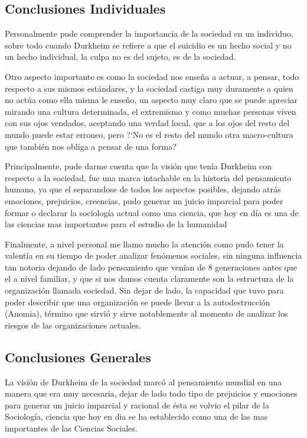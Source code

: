\subsection{Conclusiones Individuales}
Personalmente pude comprender la importancia de la sociedad en un individuo, sobre todo cuando Durkheim se refiere a que el suicidio es un hecho social y no un hecho individual,
la culpa no es del sujeto, es de la sociedad.

Otro aspecto importante es como la sociedad nos ense\~na a actuar, a pensar, todo respecto a sus mismos est\'andares, y la sociedad castiga muy duramente a quien no act\'ua como
ella misma le ense\~no, un aspecto muy claro que se puede apreciar mirando una cultura determinada, el extremismo y como muchas personas viven con sus ojos vendados, aceptando
una verdad local, que a los ojos del resto del mundo puede estar erroneo, pero ?`No es el resto del mundo otra macro-cultura que también nos obliga a pensar de una forma?

Principalmente, pude darme cuenta que la visi\'on que ten\'ia Durkheim con respecto a la sociedad, fue una marca intachable en la historia del pensamiento humano,
ya que el separandose de todos los aspectos posibles, dejando atr\'as emociones, prejuicios, creencias, pudo generar un juicio imparcial para poder formar o declarar
la sociolog\'ia actual como una ciencia, que hoy en d\'ia es una de las ciencias mas importantes para el estudio de la humanidad

Finalmente, a nivel  personal me llamo mucho la atenci\'on como pudo tener la valent\'ia en su tiempo de poder analizar fen\'omenos sociales, sin ninguna influencia tan notoria
dejando de lado pensamiento que ven\'ian de 8 generaciones antes que el a nivel familiar, y que si nos damos cuenta claramente son la estructura de la organizaci\'on llamada sociedad.
Sin dejar de lado, la capacidad que tuvo para poder describir que una organizaci\'on se puede llevar a la autodestrucci\'on (Anomia), t\'ermino que sirvi\'o y sirve notablemente al
momento de analizar los riesgos de las organizaciones actuales.



\subsection{Conclusiones Generales}

La visi\'on de Durkheim de la sociedad marc\'o al pensamiento mundial en una manera que era
muy necesaria, dejar de lado todo tipo de prejuicios y emociones para generar un juicio imparcial y
racional de \'esta se volvio el pilar de la Sociolog\'ia, ciencia que hoy en dia se ha establecido como
una de las mas importantes de las Ciencias Sociales.

